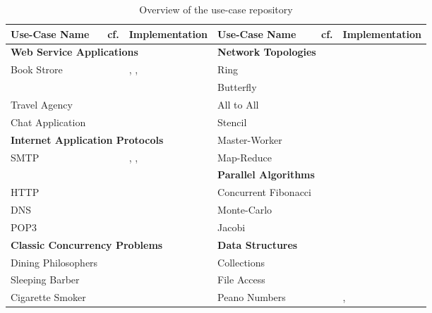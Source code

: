 \begin{table}[!h]
\begin{center}
\begin{tabular}{|l|l|l|l|l|l|}
	\hline
	Use-Case Name & cf. & Implementation
	&
	Use-Case Name & cf. & Implementation
	\\

	\hline
	\hline
	\multicolumn{3}{|l|}{ \textbf{Web Service Applications}}
	&
	\multicolumn{3}{|l|}{ \textbf{Network Topologies}}
	\\
	\hline
	Book Strore & \cite{W3C} & \SJ, \Mungo,
	&
	Ring & \cite{BerkleyPar} & \MPI	
	\\
	& & \JavaAPI
	&
	Butterfly & \cite{BerkleyPar} & \MPI
	\\
	Travel Agency & \cite{W3C} & \SJ
	&
	All to All & \cite{BerkleyPar} & \MPI	
	\\
	Chat Application & \cite{SF15} & \Erlang
	&
	Stencil & \cite{BerkleyPar} & \MPI
	\\

	\cline{1-3}
	\multicolumn{3}{|l|}{ \textbf{Internet Application Protocols}}
	&
	Master-Worker & \cite{BerkleyPar} & \MPI
	\\
	\cline{1-3}
	SMTP & \cite{RFC} & \Mungo, \Links,
	&
	Map-Reduce & \cite{BerkleyPar} & \MPI
	\\
	\cline{4-6}
	\cline{4-6}
	&&\JavaAPI
	&
	\multicolumn{3}{|l|}{ \textbf{Parallel Algorithms}}
	\\
	\cline{4-6}
	HTTP & \cite{RFC} & \JavaAPI
	&
	Concurrent Fibonacci &  & \Mungo
	\\
	DNS & \cite{RFC} & \Erlang
	&
	Monte-Carlo & \cite{book:using-mpi} & \MPI
	\\
	POP3 & \cite{RFC} & \Mungo
	&
	Jacobi & \cite{book:using-mpi} & \MPI
	\\

	\hline
	\multicolumn{3}{|l|}{ \textbf{Classic Concurrency Problems}}
	&
	\multicolumn{3}{|l|}{ \textbf{Data Structures}}
	\\
	\hline
	Dining Philosophers & \cite{Savina} & \SPython
	&
	Collections & \cite{mungo} & \Mungo
	\\
	Sleeping Barber & \cite{Savina} & \SPython
	&
	File Access & \cite{mungo} & \Mungo
	\\
	Cigarette Smoker & \cite{Savina} & \SPython
	&
	Peano Numbers & & \GV, \Links
	\\
	\hline
\end{tabular}
\end{center}
\caption{Overview of the use-case repository}
\label{table:use_cases_all}
\vspace{-10mm}
\end{table}

